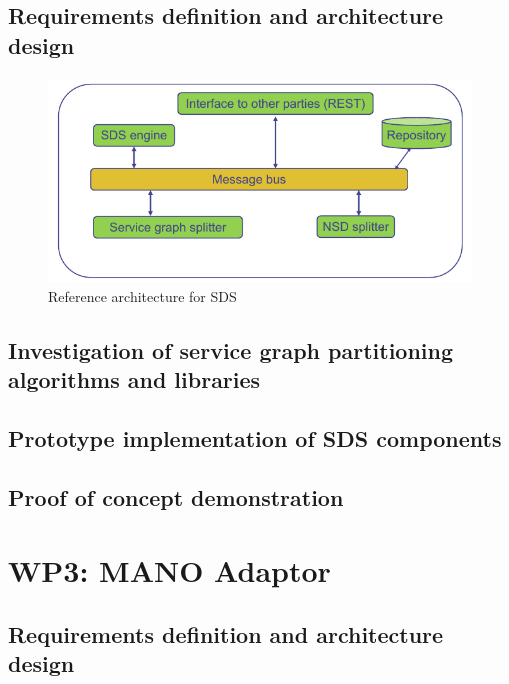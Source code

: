 \subsection{Requirements definition and architecture design}
\paragraph{}
\begin{figure}[h]
	\centering
	\includegraphics[width=0.9\linewidth]{figures/wp2Arch}
	\caption{Reference architecture for SDS}
	\label{fig:wp2arch}
\end{figure}

\subsection{Investigation of service graph partitioning algorithms and libraries}
\subsection{Prototype implementation of SDS components}
\subsection{Proof of concept demonstration}


\section{WP3: MANO Adaptor}

\subsection{Requirements definition and architecture design}
\paragraph{}

